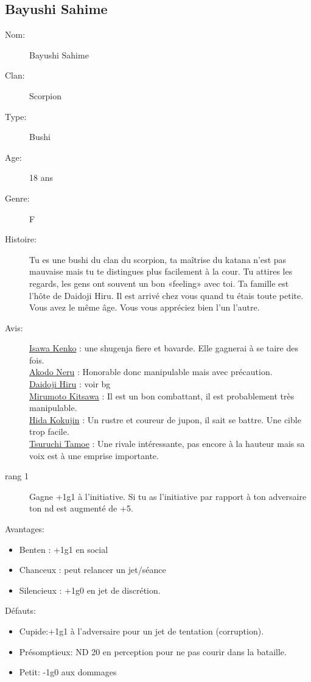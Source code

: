 \documentclass[oneside,12pt]{book}
\begin{document}
\begin{flushleft}
\section{Bayushi Sahime}
\begin{description}
\item[Nom:]{Bayushi Sahime}
\item[Clan:]{Scorpion}
\item[Type:]{Bushi}
\item[Age:]{18 ans}
\item[Genre:]{F}
\item[Histoire:]{
Tu es une bushi du clan du scorpion, ta maîtrise du katana n'est pas mauvaise mais tu te distingues plus facilement à la cour. Tu attires les regards, les gens ont souvent un bon «feeling» avec toi.
Ta famille est l'hôte de Daidoji Hiru. Il est arrivé chez vous quand tu étais toute petite. Vous avez le même âge. Vous vous appréciez bien l'un l'autre.
\vspace{0.2cm}
}
\item[Avis:]{
\underline{Isawa Kenko} : une shugenja fiere et bavarde. Elle gagnerai à se taire des fois.\\
\underline{Akodo Neru} : Honorable donc manipulable mais avec précaution.\\
\underline{Daidoji Hiru} : voir bg\\
\underline{Mirumoto Kitsawa} : Il est un bon combattant, il est probablement très manipulable. \\
\underline{Hida Kokujin} : Un rustre et coureur de jupon, il sait se battre. Une cible trop facile. \\
\underline{Tsuruchi Tamoe} : Une rivale intéressante, pas encore à la hauteur mais sa voix est à une emprise importante. \\
}
\item[rang 1]{
Gagne +1g1 à l'initiative. Si tu as l'initiative par rapport à ton adversaire ton nd est augmenté de +5.
}
\end{description}
\vspace{0.2cm}
Avantages:
\begin{itemize}
\item Benten : +1g1 en social
\item Chanceux : peut relancer un jet/séance
\item Silencieux : +1g0 en jet de discrétion. 
\end{itemize}
Défauts:
\begin{itemize}
\item Cupide:+1g1 à l'adversaire pour un jet de tentation (corruption).
\item Présomptieux: ND 20 en perception pour ne pas courir dans la bataille.
\item Petit: -1g0 aux dommages
\end{itemize}



\end{flushleft}
\end{document}
